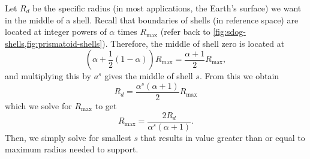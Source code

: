 Let $R_d$ be the specific radius (in most applications, the Earth's surface) we want in the middle of a shell.
Recall that boundaries of shells (in reference space) are located at integer powers of $\alpha$ times $R_\mathrm{max}$ (refer back to \cref{fig:sdog-shells,fig:prismatoid-shells}).
Therefore, the middle of shell zero is located at
%
\begin{equation*}
\left( \alpha + \frac{1}{2} (1 -\alpha) \right) R_\mathrm{max} = \frac{ \alpha + 1 }{2} R_\mathrm{max},
\end{equation*}
%
and multiplying this by $a^s$ gives the middle of shell $s$.
From this we obtain
%
\begin{equation*}
R_d = \frac{ \alpha^s \left( \alpha + 1 \right) }{2} R_\mathrm{max}
\end{equation*}
%
which we solve for $R_\mathrm{max}$ to get
%
\begin{equation*}
R_\mathrm{max} = \frac{2 R_d}{ \alpha^s \left( \alpha + 1 \right) }.
\end{equation*}
%
Then, we simply solve for smallest $s$ that results in value greater than or equal to maximum radius needed to support.
